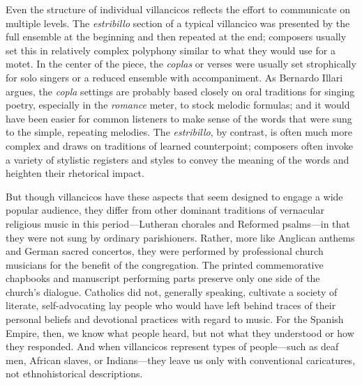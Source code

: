 Even the structure of individual villancicos reflects the effort to communicate
on multiple levels.
The \emph{estribillo} section of a typical villancico was presented by the full
ensemble at the beginning and then repeated at the end; composers usually set
this in relatively complex polyphony similar to what they would use for a
motet.
In the center of the piece, the \emph{coplas} or verses were usually set
strophically for solo singers or a reduced ensemble with accompaniment.
As Bernardo Illari argues, the \emph{copla} settings are probably based closely
on oral traditions for singing poetry, especially in the \emph{romance} meter,
to stock melodic formulas; and it would have been easier for common listeners to
make sense of the words that were sung to the simple, repeating melodies.%
    \Autocite{Illari:Polychoral}
The \emph{estribillo}, by contrast, is often much more complex and draws on
traditions of learned counterpoint; composers often invoke a variety of
stylistic registers and styles to convey the meaning of the words and heighten
their rhetorical impact.

But though villancicos have these aspects that seem designed to engage a wide
popular audience, they differ from other dominant traditions of vernacular
religious music in this period---Lutheran chorales and Reformed psalms---in
that they were not sung by ordinary parishioners.
Rather, more like Anglican anthems and German sacred concertos, they were
performed by professional church musicians for the benefit of the congregation.
The printed commemorative chapbooks and manuscript performing parts preserve
only one side of the church's dialogue.
Catholics did not, generally speaking, cultivate a society of literate,
self-advocating lay people who would have left behind traces of their personal
beliefs and devotional practices with regard to music.
For the Spanish Empire, then, we know what people heard, but not what they
understood or how they responded.%
    \Autocite{Burstyn:PeriodEar} %
And when villancicos represent types of people---such as deaf men, African
slaves, or Indians---they leave us only with conventional caricatures, not
ethnohistorical descriptions.%
    \Autocites
    {Baker:EthnicVC}
    {Baker:PerformancePostColonial}
    {Davies:LocalContent}

